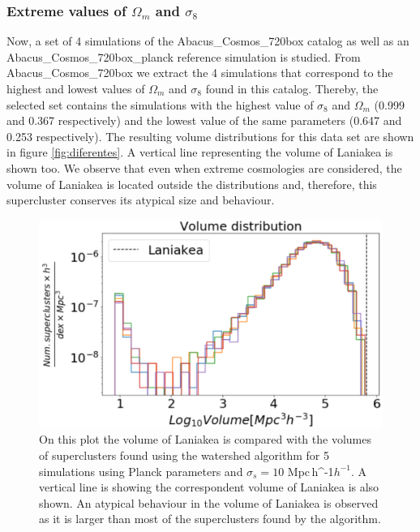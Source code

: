 \documentclass[usenatbib]{mnras}
\newcommand{\Mpch}{\,{\rm Mpc}\,\ifmmode h^{-1}\else $h^{-1}$\fi}
\begin{document}
\subsubsection{Extreme values of $\Omega_m$ and $\sigma_8$}

Now, a set of 4 simulations of the Abacus\_Cosmos\_720box catalog as
well as an Abacus\_Cosmos\_720box\_planck reference simulation is
studied. From Abacus\_Cosmos\_720box we extract the 4 simulations that
correspond to the highest and lowest values of $\Omega_m$ and
$\sigma_8$ found in this catalog. Thereby, the selected set contains
the simulations with the highest value of $\sigma_8$ and $\Omega_m$
(0.999 and 0.367 respectively) and the lowest value of the same
parameters (0.647 and 0.253 respectively). The resulting volume
distributions for this data set are shown in figure
\ref{fig:diferentes}. A vertical line representing the volume of
Laniakea is shown too. We observe that even when extreme cosmologies
are considered, the volume of Laniakea is located outside the
distributions and, therefore, this supercluster conserves its atypical
size and behaviour. 



\begin{figure}
    \centering
    \includegraphics[width=345pt]{vol_planck.pdf}
    \caption{On this plot the volume of Laniakea is compared with the
      volumes of superclusters found using the watershed algorithm for
      5 simulations using Planck parameters and $\sigma_s =
      10$\,\Mpch. A vertical line is showing the correspondent volume
      of Laniakea is also shown. An atypical behaviour in the volume
      of Laniakea is observed as it is larger than most of the
      superclusters found by the algorithm. }  
    \label{fig:planck}
\end{figure}
\end{document}

